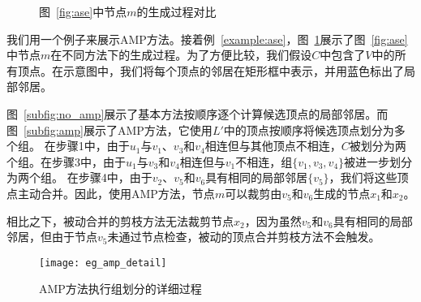 \begin{figure} 
	\centering
	
	 \quad

	\caption{图~\ref{fig:ase}中节点$m$的生成过程对比}
	\label{fig:amp}

\end{figure}

\begin{example}
  我们用一个例子来展示AMP方法。接着例~\ref{example:ase}，图~\ref{fig:amp}展示了图~\ref{fig:ase}中节点$m$在不同方法下的生成过程。为了方便比较，我们假设$C$中包含了$V$中的所有顶点。在示意图中，我们将每个顶点的邻居在矩形框中表示，并用蓝色标出了局部邻居。

  图~\ref{subfig:no_amp}展示了基本方法按顺序逐个计算候选顶点的局部邻居。而图~\ref{subfig:amp}展示了AMP方法，它使用$L'$中的顶点按顺序将候选顶点划分为多个组。  在步骤\Num1中，由于$u_1$与$v_1$、$v_3$和$v_4$相连但与其他顶点不相连，$C$被划分为两个组。在步骤\Num3中，由于$u_1$与$v_3$和$v_4$相连但与$v_1$不相连，组$\{v_1, v_3, v_4\}$被进一步划分为两个组。
在步骤\Num4中，由于$v_2$、$v_5$和$v_6$具有相同的局部邻居$\{v_5\}$，我们将这些顶点主动合并。因此，使用AMP方法，节点$m$可以裁剪由$v_5$和$v_6$生成的节点$x_1$和$x_2$。

相比之下，被动合并的剪枝方法无法裁剪节点$x_2$，因为虽然$v_5$和$v_6$具有相同的局部邻居，但由于节点$v_5$未通过节点检查，被动的顶点合并剪枝方法不会触发。

\label{example:amp}
\end{example}

\begin{figure} 
	\centering
	
  \texttt{[image: eg\_amp\_detail]}

	\caption{AMP方法执行组划分的详细过程}
	\label{fig:amp_detail}

\end{figure}

